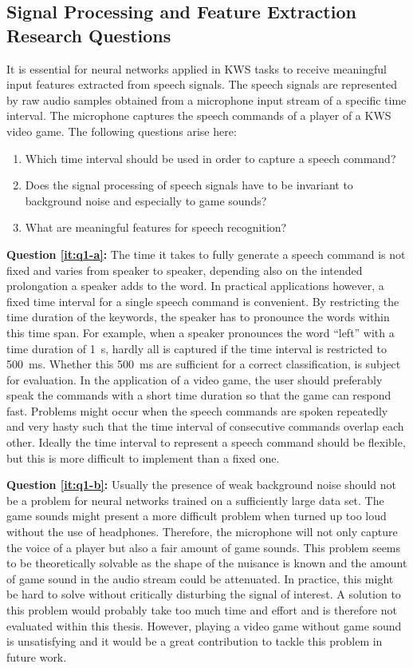 \subsection{Signal Processing and Feature Extraction Research Questions}\label{sec:intro_rq_signal}
It is essential for neural networks applied in KWS tasks to receive meaningful input features extracted from speech signals. 
The speech signals are represented by raw audio samples obtained from a microphone input stream of a specific time interval.
The microphone captures the speech commands of a player of a KWS video game.
The following questions arise here:
\begin{enumerate}[label={Q.1.\alph*)}, leftmargin=1.75cm]
  \item Which time interval should be used in order to capture a speech command?\label{it:q1-a}
  \item Does the signal processing of speech signals have to be invariant to background noise and especially to game sounds?\label{it:q1-b}
  \item What are meaningful features for speech recognition?\label{it:q1-c}
\end{enumerate}
\noindent
\textbf{Question \ref{it:q1-a}:} 
The time it takes to fully generate a speech command is not fixed and varies from speaker to speaker, depending also on the intended prolongation a speaker adds to the word.
In practical applications however, a fixed time interval for a single speech command is convenient.
By restricting the time duration of the keywords, the speaker has to pronounce the words within this time span.
For example, when a speaker pronounces the word \enquote{left} with a time duration of \SI{1}{\second}, hardly all is captured if the time interval is restricted to \SI{500}{\milli\second}.
Whether this \SI{500}{\milli\second} are sufficient for a correct classification, is subject for evaluation.
In the application of a video game, the user should preferably speak the commands with a short time duration so that the game can respond fast.
Problems might occur when the speech commands are spoken repeatedly and very hasty such that the time interval of consecutive commands overlap each other.
Ideally the time interval to represent a speech command should be flexible, but this is more difficult to implement than a fixed one.

\textbf{Question \ref{it:q1-b}:}
Usually the presence of weak background noise should not be a problem for neural networks trained on a sufficiently large data set. 
The game sounds might present a more difficult problem when turned up too loud without the use of headphones. 
Therefore, the microphone will not only capture the voice of a player but also a fair amount of game sounds. 
This problem seems to be theoretically solvable as the shape of the nuisance is known and the amount of game sound in the audio stream could be attenuated.
In practice, this might be hard to solve without critically disturbing the signal of interest.
A solution to this problem would probably take too much time and effort and is therefore not evaluated within this thesis. 
However, playing a video game without game sound is unsatisfying and it would be a great contribution to tackle this problem in future work.

